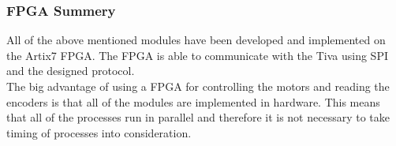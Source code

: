 \documentclass[../../../main]{subfiles}
\begin{document}
\subsubsection{FPGA Summery}
All of the above mentioned modules have been developed and implemented on the Artix7 FPGA.
The FPGA is able to communicate with the Tiva using SPI and the designed protocol.
\\
The big advantage of using a FPGA for controlling the motors and reading the encoders is that all of the modules are implemented in hardware.
This means that all of the processes run in parallel and therefore it is not necessary to take timing of processes into consideration.
\end{document}
